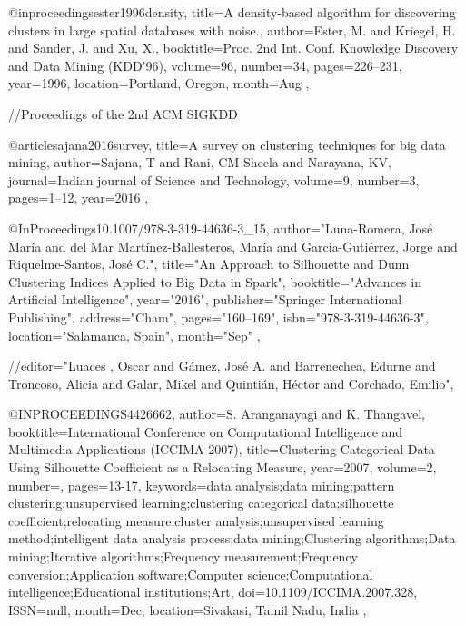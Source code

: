 @inproceedings{ester1996density,
  title={A density-based algorithm for discovering clusters in large spatial databases with noise.},
  author={Ester, M. and Kriegel, H. and Sander, J. and Xu, X.},
  booktitle={Proc. 2nd Int. Conf. Knowledge Discovery and Data Mining (KDD’96)},
  volume={96},
  number={34},
  pages={226--231},
  year={1996},
  location={Portland, Oregon},
  month={Aug}
},

//Proceedings of the 2nd ACM SIGKDD

@article{sajana2016survey,
  title={A survey on clustering techniques for big data mining},
  author={Sajana, T and Rani, CM Sheela and Narayana, KV},
  journal={Indian journal of Science and Technology},
  volume={9},
  number={3},
  pages={1--12},
  year={2016}
},

@InProceedings{10.1007/978-3-319-44636-3_15,
author="Luna-Romera, Jos{\'e} Mar{\'i}a
and del Mar Mart{\'i}nez-Ballesteros, Mar{\'i}a
and Garc{\'i}a-Guti{\'e}rrez, Jorge
and Riquelme-Santos, Jos{\'e} C.",
title="An Approach to Silhouette and Dunn Clustering Indices Applied to Big Data in Spark",
booktitle="Advances in Artificial Intelligence",
year="2016",
publisher="Springer International Publishing",
address="Cham",
pages="160--169",
isbn="978-3-319-44636-3",
location="Salamanca, Spain",
month="Sep"
},

//editor="Luaces , Oscar
and G{\'a}mez, Jos{\'e} A.
and Barrenechea, Edurne
and Troncoso, Alicia
and Galar, Mikel
and Quinti{\'a}n, H{\'e}ctor
and Corchado, Emilio",

@INPROCEEDINGS{4426662, 
author={S. {Aranganayagi} and K. {Thangavel}}, 
booktitle={International Conference on Computational Intelligence and Multimedia Applications (ICCIMA 2007)}, 
title={Clustering Categorical Data Using Silhouette Coefficient as a Relocating Measure}, 
year={2007}, 
volume={2}, 
number={}, 
pages={13-17}, 
keywords={data analysis;data mining;pattern clustering;unsupervised learning;clustering categorical data;silhouette coefficient;relocating measure;cluster analysis;unsupervised learning method;intelligent data analysis process;data mining;Clustering algorithms;Data mining;Iterative algorithms;Frequency measurement;Frequency conversion;Application software;Computer science;Computational intelligence;Educational institutions;Art}, 
doi={10.1109/ICCIMA.2007.328}, 
ISSN={null}, 
month={Dec},
location={Sivakasi, Tamil Nadu, India }},


